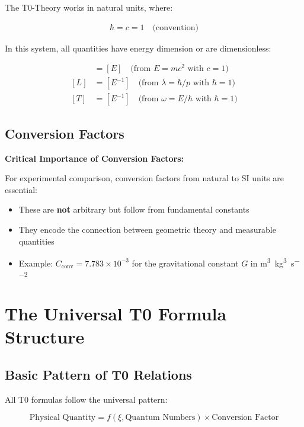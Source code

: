 \documentclass[12pt,a4paper]{article}
\newcommand{\xipar}{\xi}
\begin{document}
	The T0-Theory works in natural units, where:
	
	\begin{align}
		\hbar = c = 1 \quad \text{(convention)}
	\end{align}
	
	In this system, all quantities have energy dimension or are dimensionless:
	
	\begin{align}
		[M] &= [E] \quad \text{(from $E = mc^2$ with $c = 1$)} \\
		[L] &= [E^{-1}] \quad \text{(from $\lambda = \hbar/p$ with $\hbar = 1$)} \\
		[T] &= [E^{-1}] \quad \text{(from $\omega = E/\hbar$ with $\hbar = 1$)}
	\end{align}
	
	\subsection{Conversion Factors}
	
	\begin{warning}
		\textbf{Critical Importance of Conversion Factors:}
		
		For experimental comparison, conversion factors from natural to SI units are essential:
		\begin{itemize}
			\item These are \textbf{not} arbitrary but follow from fundamental constants
			\item They encode the connection between geometric theory and measurable quantities
			\item Example: $C_{\text{conv}} = 7.783 \times 10^{-3}$ for the gravitational constant $G$ in \si{\cubic\meter\per\cubic\kilo\gram\per\square\second}
		\end{itemize}
	\end{warning}
	
	\section{The Universal T0 Formula Structure}
	
	\subsection{Basic Pattern of T0 Relations}
	
	All T0 formulas follow the universal pattern:
	
	\begin{equation}
		\boxed{\text{Physical Quantity} = f(\xipar, \text{Quantum Numbers}) \times \text{Conversion Factor}}
		\label{eq:universal_pattern}
	\end{equation}
	
\end{document}
